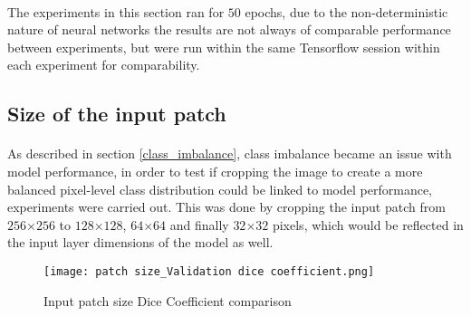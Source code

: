 \paragraph{}
The experiments in this section ran for $50$ epochs, due to the non-deterministic nature of neural networks the results are not always of comparable performance between experiments, but were run within the same Tensorflow session within each experiment for comparability.
\subsection{Size of the input patch} \label{patch_size_exp}
\paragraph{}
As described in section \ref{class_imbalance}, class imbalance became an issue with model performance, in order to test if cropping the image to create a more balanced pixel-level class distribution could be linked to model performance, experiments were carried out. This was done by cropping the input patch from $256$×$256$ to $128$×$128$, $64$×$64$ and finally $32$×$32$ pixels, which would be reflected in the input layer dimensions of the model as well.

\begin{figure}[hbt!]
    \centering
    \texttt{[image: patch size\_Validation dice coefficient.png]}
    \caption{Input patch size Dice Coefficient comparison}
    \label{patch_dice}
\end{figure}

